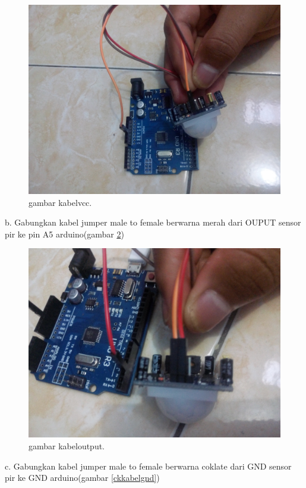 \begin{figure} [ht]
\centerline{\includegraphics[width=1\textwidth]{figures/kabelvcc.JPG}}
\caption{gambar kabelvcc.}
\label{carakoneksikabelvcc}
\end{figure}

b. Gabungkan kabel jumper male to female berwarna merah dari OUPUT sensor pir ke pin A5 arduino(gambar \ref{ckkabeloutput})

\begin{figure} [ht]
\centerline{\includegraphics[width=1\textwidth]{figures/kabeloutput.JPG}}
\caption{gambar kabeloutput.}
\label{ckkabeloutput}
\end{figure}

c. Gabungkan kabel jumper male to female berwarna coklate dari GND sensor pir ke GND arduino(gambar \ref{ckkabelgnd})

